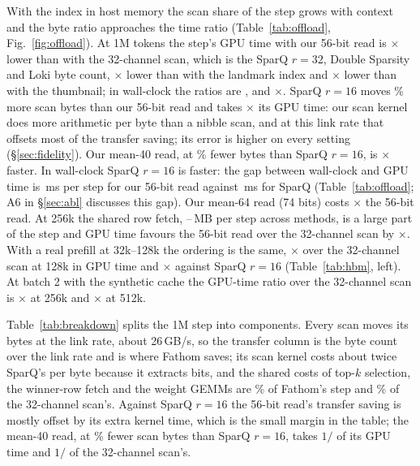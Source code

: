 \documentclass[10pt,twocolumn]{article}
\newcommand{\tabin}[1]{\IfFileExists{tables/#1.tex}{}{\fbox{\small missing table \detokenize{#1}}}}
\begin{document}
With the index in host memory the scan share of the step grows with context and the byte ratio approaches the time ratio (Table~\ref{tab:offload}, Fig.~\ref{fig:offload}). At 1M tokens the step's GPU time with our 56-bit read is \ratioGPUchanr{}$\times$ lower than with the 32-channel scan, which is the SparQ $r=32$, Double Sparsity and Loki byte count, \ratioGPUlandmark$\times$ lower than with the landmark index and \ratioGPUplanesthumb$\times$ lower than with the thumbnail; in wall-clock the ratios are \ratioWallchanr, \ratioWalllandmark{} and \ratioWallplanesthumb$\times$. SparQ $r=16$ moves \sparqSixteenBytesMorePct\% more scan bytes than our 56-bit read and takes \ratioGPUchanrsixteen$\times$ its GPU time: our scan kernel does more arithmetic per byte than a nibble scan, and at this link rate that offsets most of the transfer saving; its error is higher on every setting (\S\ref{sec:fidelity}). Our mean-40 read, at \fortyBytesFewerPct\% fewer bytes than SparQ $r=16$, is \ratioSparqSixteenOverForty$\times$ faster. In wall-clock SparQ $r=16$ is faster: the gap between wall-clock and GPU time is \issueplanesmean\,ms per step for our 56-bit read against \issuechanrsixteen\,ms for SparQ (Table~\ref{tab:offload}; A6 in \S\ref{sec:abl} discusses this gap). Our mean-64 read (74 bits) costs \ratioGPUplanesmeansixtyfour$\times$ the 56-bit read. At 256k the shared row fetch, \rowsMBmin--\rowsMBmax\,MB per step across methods, is a large part of the step and GPU time favours the 56-bit read over the 32-channel scan by \ratioGPUchanAt{}$\times$. With a real prefill at 32k--128k the ordering is the same, \realRatio{}$\times$ over the 32-channel scan at 128k in GPU time and \realRatioSparq{}$\times$ against SparQ $r=16$ (Table~\ref{tab:hbm}, left). At batch 2 with the synthetic cache the GPU-time ratio over the 32-channel scan is \bTwoRatioShort$\times$ at 256k and \bTwoRatioLong$\times$ at 512k.

\begin{table}[t]\centering\small
\caption{Where the 1M-token step goes: GPU time per component (ms) from the profiler trace of the host-index run, Qwen3-8B, batch 1. ``scan total'' is transfer plus kernel, the part a scan method changes; top-$k$, row fetch and the weight matrix multiplications (GEMMs) are shared by every method. The landmark index scores with a GEMM, counted in the GEMM column.}
\label{tab:breakdown}
\resizebox{\textwidth}{!}{\tabin{tab_breakdown}}
\end{table}
Table~\ref{tab:breakdown} splits the 1M step into components. Every scan moves its bytes at the link rate, about 26\,GB/s, so the transfer column is the byte count over the link rate and is where Fathom saves; its scan kernel costs about twice SparQ's per byte because it extracts bits, and the shared costs of top-$k$ selection, the winner-row fetch and the weight GEMMs are \sharedPctOurs\% of Fathom's step and \sharedPctChan\% of the 32-channel scan's. Against SparQ $r=16$ the 56-bit read's transfer saving is mostly offset by its extra kernel time, which is the small margin in the table; the mean-40 read, at \fortyBytesFewerPct\% fewer scan bytes than SparQ $r=16$, takes $1/$\ratioSparqSixteenOverForty{} of its GPU time and $1/$\ratioChanOverForty{} of the 32-channel scan's.
\end{document}
